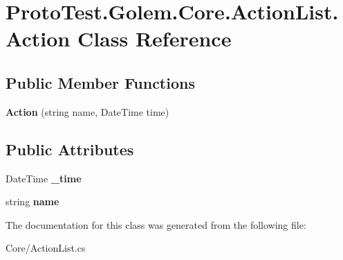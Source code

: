 \hypertarget{class_proto_test_1_1_golem_1_1_core_1_1_action_list_1_1_action}{\section{Proto\-Test.\-Golem.\-Core.\-Action\-List.\-Action Class Reference}
\label{class_proto_test_1_1_golem_1_1_core_1_1_action_list_1_1_action}
}
\subsection*{Public Member Functions}
\begin{DoxyCompactItemize}
\item 
\hypertarget{class_proto_test_1_1_golem_1_1_core_1_1_action_list_1_1_action_a2880ca7a7e1815bc11ecb137edbcecd7}{{\bfseries Action} (string name, Date\-Time time)}\label{class_proto_test_1_1_golem_1_1_core_1_1_action_list_1_1_action_a2880ca7a7e1815bc11ecb137edbcecd7}

\end{DoxyCompactItemize}
\subsection*{Public Attributes}
\begin{DoxyCompactItemize}
\item 
\hypertarget{class_proto_test_1_1_golem_1_1_core_1_1_action_list_1_1_action_afaf2d77bfc67fd1a3a1f23eb6beec97c}{Date\-Time {\bfseries \-\_\-time}}\label{class_proto_test_1_1_golem_1_1_core_1_1_action_list_1_1_action_afaf2d77bfc67fd1a3a1f23eb6beec97c}

\item 
\hypertarget{class_proto_test_1_1_golem_1_1_core_1_1_action_list_1_1_action_af4da62989478bd6a054c4d119d754790}{string {\bfseries name}}\label{class_proto_test_1_1_golem_1_1_core_1_1_action_list_1_1_action_af4da62989478bd6a054c4d119d754790}

\end{DoxyCompactItemize}


The documentation for this class was generated from the following file\-:\begin{DoxyCompactItemize}
\item 
Core/Action\-List.\-cs\end{DoxyCompactItemize}
